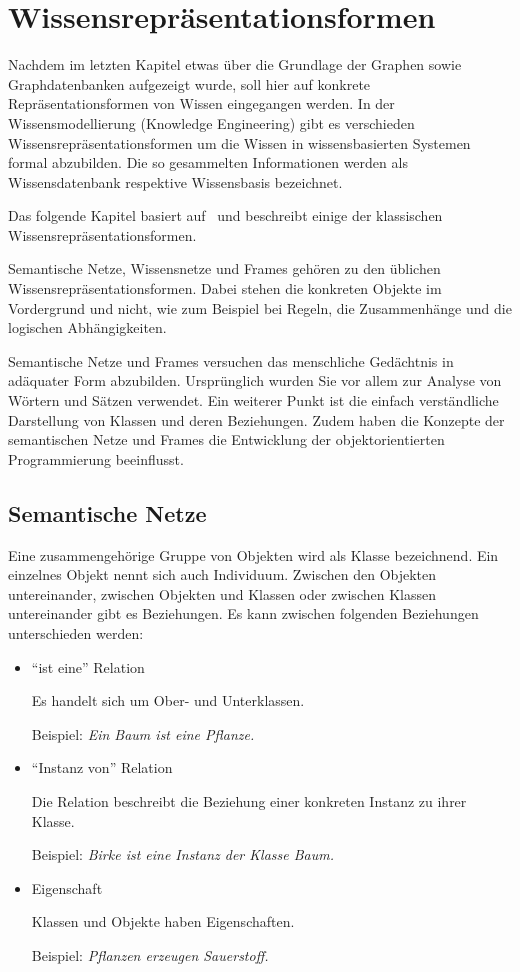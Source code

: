 \chapter{Wissensrepräsentationsformen}
\label{chap:wissensrepFormen}

Nachdem im letzten Kapitel etwas über die Grundlage der Graphen sowie Graphdatenbanken aufgezeigt wurde, soll hier auf konkrete Repräsentationsformen von Wissen eingegangen werden.
In der Wissensmodellierung (Knowledge Engineering) gibt es verschieden Wissensrepräsentationsformen um die Wissen in wissensbasierten Systemen formal abzubilden. Die so gesammelten Informationen werden als Wissensdatenbank respektive Wissensbasis bezeichnet.~\cite{wikiWissensrep}

Das folgende Kapitel basiert auf~\cite{laemmel} und beschreibt einige der klassischen Wissensrepräsentationsformen.

Semantische Netze, Wissensnetze und Frames gehören zu den üblichen Wissensrepräsentationsformen. Dabei stehen die konkreten Objekte im Vordergrund und nicht, wie zum Beispiel bei Regeln, die Zusammenhänge und die logischen Abhängigkeiten.

Semantische Netze und Frames versuchen das menschliche Gedächtnis in adäquater Form abzubilden. Ursprünglich wurden Sie vor allem zur Analyse von Wörtern und Sätzen verwendet. Ein weiterer Punkt ist die einfach verständliche Darstellung von Klassen und deren Beziehungen. Zudem haben die Konzepte der semantischen Netze und Frames die Entwicklung der objektorientierten Programmierung beeinflusst.

\section{Semantische Netze}
\label{sec:wissensrepFormen_semantischeNetze}

Eine zusammengehörige Gruppe von Objekten wird als Klasse bezeichnend. Ein einzelnes Objekt nennt sich auch Individuum. Zwischen den Objekten untereinander, zwischen Objekten und Klassen oder zwischen Klassen untereinander gibt es Beziehungen. Es kann zwischen folgenden Beziehungen unterschieden werden:

\begin{itemize}
    \item "`ist eine"' Relation

        Es handelt sich um Ober- und Unterklassen.

        Beispiel: \textit{Ein Baum ist eine Pflanze.}

    \item "`Instanz von"' Relation

        Die Relation beschreibt die Beziehung einer konkreten Instanz zu ihrer Klasse.

        Beispiel: \textit{Birke ist eine Instanz der Klasse Baum.}

    \item Eigenschaft

        Klassen und Objekte haben Eigenschaften.

        Beispiel: \textit{Pflanzen erzeugen Sauerstoff.}
\end{itemize}

